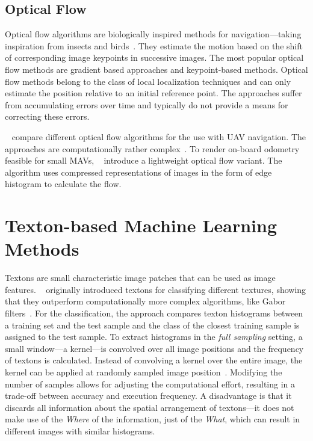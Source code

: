 \documentclass{report}
\begin{document}
\subsection{Optical Flow}
\label{sec:opticalflow}

Optical flow algorithms are biologically inspired methods for
navigation---taking inspiration from insects and
birds~\cite{ruffier2003bio}. They estimate the motion based on the
shift of corresponding image keypoints in successive images. The most
popular optical flow methods are gradient based approaches and
keypoint-based methods.
Optical flow methods belong to the class of local localization
techniques and can only estimate the position relative to an initial
reference point. The approaches suffer from accumulating errors over
time and typically do not provide a means for correcting these errors.

\citeauthor{chao2013survey}~\cite{chao2013survey} compare
different optical flow algorithms for the use with UAV navigation. The
approaches are computationally rather
complex~\cite{mcguire2016local}. To render on-board odometry feasible
for small MAVs, \citeauthor{mcguire2016local}~\cite{mcguire2016local}
introduce a lightweight optical flow variant. The algorithm uses
compressed representations of images in the form of edge histogram to
calculate the flow.

\section{Texton-based Machine Learning Methods}
\label{sec:textonbasedapproaches}

Textons are small characteristic image patches that can be used as
image
features. \citeauthor{varma2005statistical}~\cite{varma2005statistical}
originally introduced textons for classifying different textures,
showing that they outperform computationally more complex algorithms,
like Gabor filters~\cite{varma2005statistical}. For the
classification, the approach compares texton histograms between a
training set and the test sample and the class of the closest training
sample is assigned to the test sample. To extract histograms in the
\emph{full sampling} setting, a small window---a kernel---is convolved
over all image positions and the frequency of textons is calculated.
Instead of convolving a kernel over the entire image, the kernel can
be applied at randomly sampled image
position~\cite{de2012sub}. %
Modifying the number of samples allows for adjusting the computational
effort, resulting in a trade-off between accuracy and execution
frequency. A disadvantage is that it discards all information about
the spatial arrangement of textons---it does not make use of the
\emph{Where} of the information, just of the \emph{What}, which can
result in different images with similar histograms.
\end{document}
